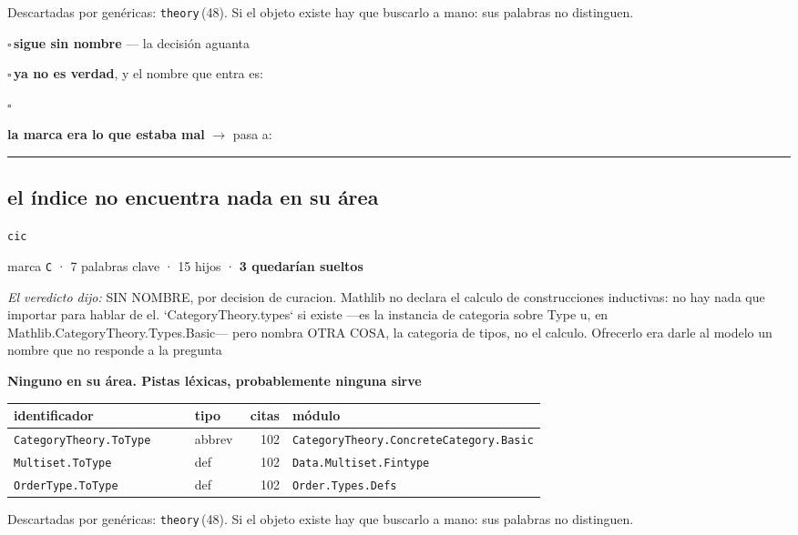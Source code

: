 \documentclass[10pt,a4paper]{article}
\begin{document}
{\footnotesize\color{suave}Descartadas por genéricas: \texttt{theory}\,(48). Si el objeto existe hay que buscarlo a mano: sus palabras no distinguen.}\par\smallskip
\noindent$\square$\,{\small \textbf{sigue sin nombre} — la decisión aguanta}\par
\noindent$\square$\,{\small \textbf{ya no es verdad}, y el nombre que entra es: \dotfill}\par
\noindent$\square$\,{\small \textbf{la marca era lo que estaba mal} $\rightarrow$ pasa a: \rule{2em}{0.4pt}}\par
\medskip
\subsection*{el índice no encuentra nada en su área}
\noindent\texttt{cic}\par
{\small\color{suave}marca \texttt{C} · 7 palabras clave · 15 hijos · \textbf{3 quedarían sueltos}}\par\smallskip
{\small\emph{El veredicto dijo:} SIN NOMBRE, por decision de curacion. Mathlib no declara el calculo de construcciones inductivas: no hay nada que importar para hablar de el. `CategoryTheory.types` si existe —es la instancia de categoria sobre Type u, en Mathlib.CategoryTheory.Types.Basic— pero nombra OTRA COSA, la categoria de tipos, no el calculo. Ofrecerlo era darle al modelo un nombre que no responde a la pregunta}\par\smallskip
{\small\textbf{Ninguno en su área. Pistas léxicas, probablemente ninguna sirve}}\par\smallskip
\noindent\small\begin{tabular}{@{}>{\raggedright\arraybackslash}p{0.34\linewidth}l r>{\raggedright\arraybackslash}p{0.34\linewidth}@{}}\toprule
identificador & tipo & citas & módulo\\\midrule
\texttt{CategoryTheory.\allowbreak{}ToType} & abbrev & 102 & \texttt{CategoryTheory.\allowbreak{}ConcreteCategory.\allowbreak{}Basic}\\
\texttt{Multiset.\allowbreak{}ToType} & def & 102 & \texttt{Data.\allowbreak{}Multiset.\allowbreak{}Fintype}\\
\texttt{OrderType.\allowbreak{}ToType} & def & 102 & \texttt{Order.\allowbreak{}Types.\allowbreak{}Defs}\\
\bottomrule\end{tabular}\par\smallskip
{\footnotesize\color{suave}Descartadas por genéricas: \texttt{theory}\,(48). Si el objeto existe hay que buscarlo a mano: sus palabras no distinguen.}\par\smallskip
\end{document}
